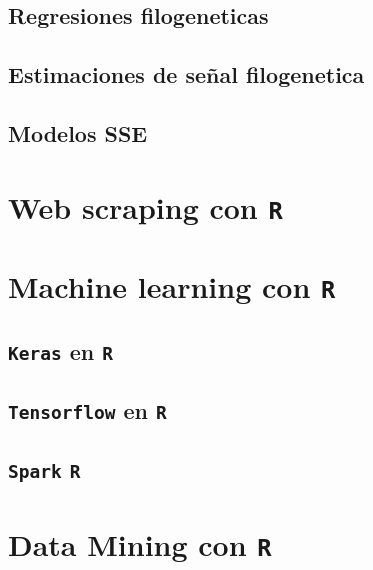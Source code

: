 \documentclass[
]{book}
\begin{document}
\hypertarget{regresiones-filogeneticas}{%
\section{Regresiones filogeneticas}\label{regresiones-filogeneticas}}

\hypertarget{estimaciones-de-seuxf1al-filogenetica}{%
\section{Estimaciones de señal filogenetica}\label{estimaciones-de-seuxf1al-filogenetica}}

\hypertarget{modelos-sse}{%
\section{Modelos SSE}\label{modelos-sse}}

\hypertarget{web-scraping-con-r}{%
\chapter{\texorpdfstring{Web scraping con \texttt{R}}{Web scraping con R}}\label{web-scraping-con-r}}

\hypertarget{machine-learning-con-r}{%
\chapter{\texorpdfstring{Machine learning con \texttt{R}}{Machine learning con R}}\label{machine-learning-con-r}}

\hypertarget{keras-en-r}{%
\section{\texorpdfstring{\texttt{Keras} en \texttt{R}}{Keras en R}}\label{keras-en-r}}

\hypertarget{tensorflow-en-r}{%
\section{\texorpdfstring{\texttt{Tensorflow} en \texttt{R}}{Tensorflow en R}}\label{tensorflow-en-r}}

\hypertarget{spark-r}{%
\section{\texorpdfstring{\texttt{Spark} \texttt{R}}{Spark R}}\label{spark-r}}

\hypertarget{data-mining-con-r}{%
\chapter{\texorpdfstring{Data Mining con \texttt{R}}{Data Mining con R}}\label{data-mining-con-r}}
\end{document}
